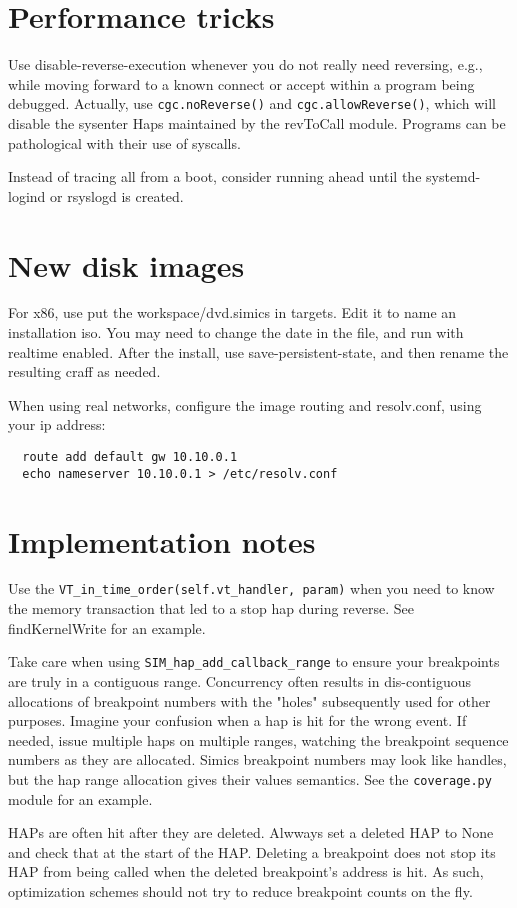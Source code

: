\documentclass[titlepage]{article}
\begin{document}
\begin{appendices}
\section{Performance tricks}
Use disable-reverse-execution whenever you do not really need reversing, e.g., while moving forward to a known connect or accept
within a program being debugged.  Actually, use {\tt cgc.noReverse()} and {\tt cgc.allowReverse()}, which will disable the sysenter
Haps maintained by the revToCall module.  Programs can be pathological with their use of syscalls.

Instead of tracing all from a boot, consider running ahead until the systemd-logind or rsyslogd is created.

\section{New disk images}
For x86, use put the workspace/dvd.simics in targets.  Edit it to name an installation iso.  You may need to change the date in
the file, and run with realtime enabled.  After the install, use save-persistent-state, and then rename the resulting craff as
needed.

When using real networks, configure the image routing and resolv.conf, using your ip address:
\begin{verbatim}
  route add default gw 10.10.0.1
  echo nameserver 10.10.0.1 > /etc/resolv.conf
\end{verbatim}


\section{Implementation notes}
Use the {\tt VT\_in\_time\_order(self.vt\_handler, param)} when you need to know the memory transaction that
led to a stop hap during reverse.  See findKernelWrite for an example.

Take care when using {\tt SIM\_hap\_add\_callback\_range} to ensure your breakpoints are truly in a contiguous range.
Concurrency often results in dis-contiguous allocations of breakpoint numbers with the "holes" subsequently used for other purposes.
Imagine your confusion when a hap is hit for the wrong event.  If needed, issue multiple haps on multiple ranges, watching the
breakpoint sequence numbers as they are allocated.  Simics breakpoint numbers may look like handles, but the hap range allocation 
gives their values semantics.  See the {\tt coverage.py} module for an example.

HAPs are often hit after they are deleted.  Alwways set a deleted HAP to None and check that at the start of the HAP.
Deleting a breakpoint does not stop its HAP from being called when the deleted breakpoint's address is hit.  As such,
optimization schemes should not try to reduce breakpoint counts on the fly.


\end{appendices}
\end{document}
